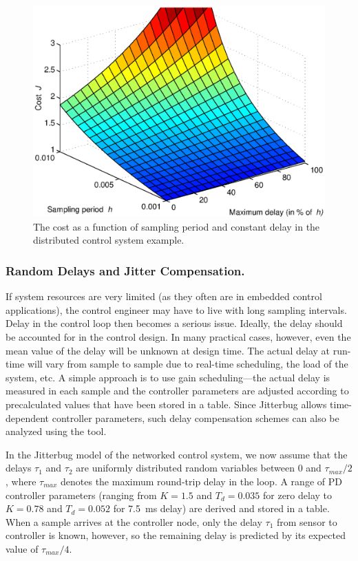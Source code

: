 \documentclass[final,twoside]{rapport}  %
\begin{document}
\begin{figure}[tbp]
\center
\includegraphics[width=0.75\hsize]{case2.eps}
\caption{The cost as a function of sampling period and constant delay
  in the distributed control system example.}
\label{fig:perioddelay}
\end{figure}

\subsubsection*{Random Delays and Jitter Compensation.}
If system resources are very limited (as they often are in embedded
control applications), the control engineer may have to live with long
sampling intervals. Delay in the control loop then becomes a serious
issue. Ideally, the delay should be accounted for in the control
design. In many practical cases, however, even the mean value of the
delay will be unknown at design time. The actual delay at run-time
will vary from sample to sample due to real-time scheduling, the load
of the system, etc. A simple approach is to use gain
scheduling---the actual delay is measured in each sample and the
controller parameters are adjusted according to precalculated values
that have been stored in a table. Since {\sc Jitterbug} allows
time-dependent controller parameters, such delay compensation schemes
can also be analyzed using the tool.

In the {\sc Jitterbug} model of the networked control system, we now
assume that the delays $\tau_1$ and $\tau_2$ are uniformly distributed
random variables between 0 and $\tau_{max}/2$, where
$\tau_{max}$ denotes the maximum round-trip delay in the 
loop. A range of PD controller parameters (ranging from $K=1.5$ and
$T_d=0.035$ for zero delay to $K=0.78$ and $T_d=0.052$ for
7.5~ms delay) are derived and stored in a table. When a sample
arrives at the controller node, only the delay $\tau_1$ from sensor to
controller is known, however, so the remaining delay is predicted by
its expected value of $\tau_{max}/4$. 
\end{document}
